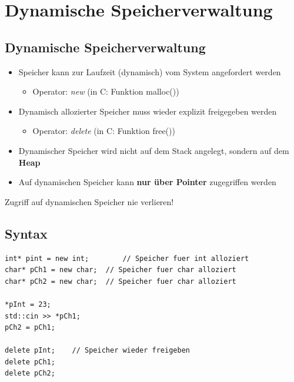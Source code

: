 \section{Dynamische Speicherverwaltung}

\subsection{Dynamische Speicherverwaltung}
\begin{itemize}
	\item Speicher kann zur Laufzeit (dynamisch) vom System angefordert werden
	\begin{itemize}
		\item Operator: \emph{new} (in C: Funktion malloc())
	\end{itemize}
	\item Dynamisch allozierter Speicher muss wieder explizit freigegeben werden
	\begin{itemize}
		\item Operator: \emph{delete} (in C: Funktion free())
	\end{itemize}
	\item Dynamischer Speicher wird nicht auf dem Stack angelegt, sondern auf dem \textbf{Heap}
	\item Auf dynamischen Speicher kann \textbf{nur über Pointer} zugegriffen werden
\end{itemize}
\begin{achtung}
Zugriff auf dynamischen Speicher nie verlieren!
\end{achtung}

\subsection{Syntax}
\vspace{-\baselineskip}
\begin{minipage}{0.7\linewidth}
\begin{lstlisting}
int* pint = new int;		// Speicher fuer int alloziert
char* pCh1 = new char;	// Speicher fuer char alloziert
char* pCh2 = new char;	// Speicher fuer char alloziert

*pInt = 23;
std::cin >> *pCh1;
pCh2 = pCh1;

delete pInt;	// Speicher wieder freigeben
delete pCh1;
delete pCh2;
\end{lstlisting}
\end{minipage}%
\begin{minipage}{0.3\linewidth}
\vspace{\baselineskip}
\end{minipage}
\vfill\null
\pagebreak


